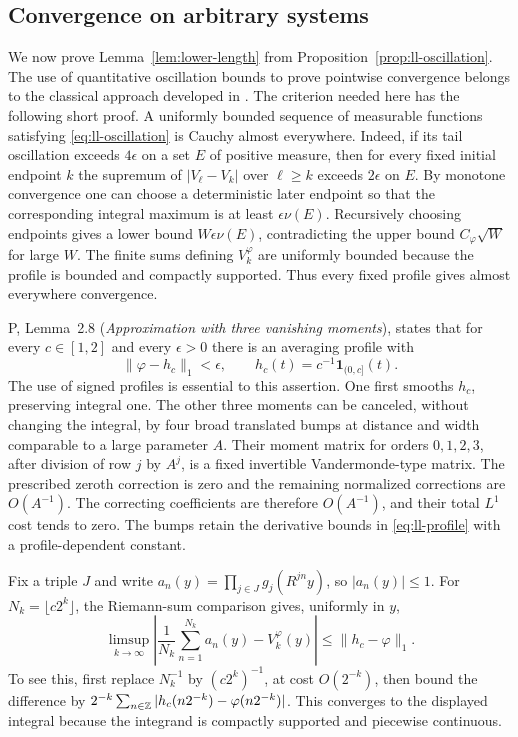 \subsection{Convergence on arbitrary systems}
\label{subsec:ll-convergence}

We now prove Lemma~\ref{lem:lower-length} from
Proposition~\ref{prop:ll-oscillation}.  The use of quantitative
oscillation bounds to prove pointwise convergence belongs to the
classical approach developed in \cite{JonesKaufmanRosenblattWierdl}.
The criterion needed here has the following short proof.
A uniformly bounded
sequence of measurable functions satisfying
\eqref{eq:ll-oscillation} is Cauchy almost everywhere.  Indeed, if
its tail oscillation exceeds $4\epsilon$ on a set $E$ of positive
measure, then for every fixed initial endpoint $k$ the supremum
of $|V_\ell-V_k|$ over $\ell\ge k$ exceeds $2\epsilon$ on $E$.
By monotone convergence one can choose a deterministic later endpoint
so that the corresponding integral maximum is at least
$\epsilon\nu(E)$.  Recursively choosing endpoints gives a lower
bound $W\epsilon\nu(E)$, contradicting the upper bound
$C_\varphi\sqrt W$ for large $W$.  The finite sums defining
$V_k^\varphi$ are uniformly bounded because the profile is bounded
and compactly supported.  Thus every fixed profile gives almost
everywhere convergence.

P, Lemma~2.8 (\emph{Approximation with three vanishing moments}),
states that for every $c\in[1,2]$ and every $\epsilon>0$ there is
an averaging profile with
\begin{equation}
 \|\varphi-h_c\|_1<\epsilon,
 \qquad h_c(t)=c^{-1}\mathbf1_{(0,c]}(t).
 \label{eq:ll-profile-approximation}
\end{equation}
The use of signed profiles is essential to this assertion.  One
first smooths $h_c$, preserving integral one.  The other three
moments can be canceled, without changing the integral, by four
broad translated bumps at distance and width comparable to a large
parameter $A$.  Their moment matrix for orders $0,1,2,3$, after
division of row $j$ by $A^j$, is a fixed invertible Vandermonde-type
matrix.  The prescribed zeroth correction is zero and the remaining
normalized corrections are $O(A^{-1})$.  The correcting coefficients
are therefore $O(A^{-1})$, and their total $L^1$ cost tends to zero.  The bumps
retain the derivative bounds in \eqref{eq:ll-profile} with a
profile-dependent constant.

Fix a triple $J$ and write
$a_n(y)=\prod_{j\in J}g_j(R^{jn}y)$, so $|a_n(y)|\le1$.
For $N_k=\lfloor c2^k\rfloor$, the Riemann-sum comparison gives,
uniformly in $y$,
\begin{equation}
 \limsup_{k\to\infty}
 \left|\frac1{N_k}\sum_{n=1}^{N_k}a_n(y)-V_k^\varphi(y)\right|
 \le\|h_c-\varphi\|_1.
 \label{eq:ll-profile-error}
\end{equation}
To see this, first replace $N_k^{-1}$ by $(c2^k)^{-1}$, at cost
$O(2^{-k})$, then bound the difference by
$2^{-k}\sum_{n\in\mathbb Z}|h_c(n2^{-k})-\varphi(n2^{-k})|$.
This converges to the displayed integral because the integrand is
compactly supported and piecewise continuous.

